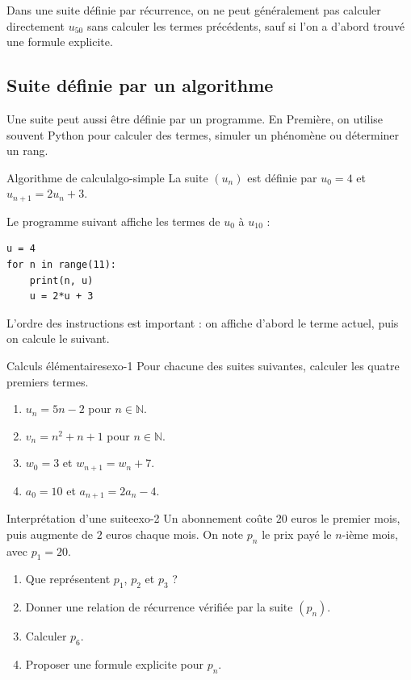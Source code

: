 \documentclass[11pt,a4paper]{article}
\newcommand{\N}{\mathbb{N}}
\begin{document}
\begin{warningbox}
Dans une suite définie par récurrence, on ne peut généralement pas calculer directement $u_{50}$ sans calculer les termes précédents, sauf si l'on a d'abord trouvé une formule explicite.
\end{warningbox}

\subsection{Suite définie par un algorithme}

Une suite peut aussi être définie par un programme. En Première, on utilise souvent Python pour calculer des termes, simuler un phénomène ou déterminer un rang.

\begin{examplebox}{Algorithme de calcul}{algo-simple}
La suite $(u_n)$ est définie par $u_0=4$ et $u_{n+1}=2u_n+3$.

Le programme suivant affiche les termes de $u_0$ à $u_{10}$ :
\begin{verbatim}
u = 4
for n in range(11):
    print(n, u)
    u = 2*u + 3
\end{verbatim}
L'ordre des instructions est important : on affiche d'abord le terme actuel, puis on calcule le suivant.
\end{examplebox}

\begin{exercisebox}{Calculs élémentaires}{exo-1}
Pour chacune des suites suivantes, calculer les quatre premiers termes.
\begin{enumerate}[label=\alph*)]
  \item $u_n=5n-2$ pour $n\in\N$.
  \item $v_n=n^2+n+1$ pour $n\in\N$.
  \item $w_0=3$ et $w_{n+1}=w_n+7$.
  \item $a_0=10$ et $a_{n+1}=2a_n-4$.
\end{enumerate}
\end{exercisebox}

\begin{exercisebox}{Interprétation d'une suite}{exo-2}
Un abonnement coûte $20$ euros le premier mois, puis augmente de $2$ euros chaque mois. On note $p_n$ le prix payé le $n$-ième mois, avec $p_1=20$.
\begin{enumerate}
  \item Que représentent $p_1$, $p_2$ et $p_3$ ?
  \item Donner une relation de récurrence vérifiée par la suite $(p_n)$.
  \item Calculer $p_6$.
  \item Proposer une formule explicite pour $p_n$.
\end{enumerate}
\end{exercisebox}
\end{document}
